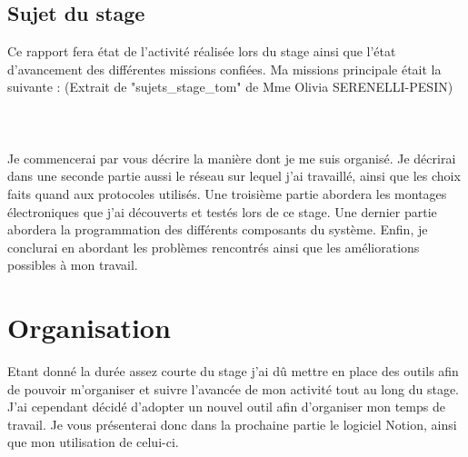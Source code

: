\documentclass[12pt,french,a4paper]{article}
\begin{document}
\subsection{Sujet du stage}
Ce rapport fera état de l'activité réalisée lors du stage ainsi que l'état d'avancement des différentes missions confiées. Ma missions principale était la suivante : (Extrait de "sujets\_stage\_tom" de Mme Olivia SERENELLI-PESIN) 
\\
\\
\\
\\
Je commencerai par vous décrire la manière dont je me suis organisé. Je décrirai dans une seconde partie aussi le réseau sur lequel j'ai travaillé, ainsi que les choix faits quand aux protocoles utilisés. Une troisième partie abordera les montages électroniques que j'ai découverts et testés lors de ce stage. Une dernier partie abordera la programmation des différents composants du système. Enfin, je conclurai en abordant les problèmes rencontrés ainsi que les améliorations possibles à mon travail.

\newpage
\section{Organisation}
Etant donné la durée assez courte du stage j'ai dû mettre en place des outils afin de pouvoir m'organiser et suivre l'avancée de mon activité tout au long du stage.
\\
J'ai cependant décidé d'adopter un nouvel outil afin d'organiser mon temps de travail. Je vous présenterai donc dans la prochaine partie le logiciel Notion, ainsi que mon utilisation de celui-ci.
\end{document}
